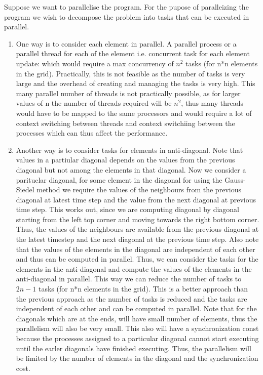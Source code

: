 \documentclass[12pt]{article}
\begin{document}
Suppose we want to parallelise the program. For the pupose of paralleizing the program we wish to decompose the problem into tasks that can be executed in parallel.
\begin{enumerate}
\item One way is to consider each element in parallel. A parallel process or a parallel thread for each of the element i.e. concurrent task for each element update:
which would require a max concurrency of $n^2$ tasks (for n*n elements in the grid). Practically, this is not feasible as the number of tasks is very large and the overhead of creating and managing the tasks is very high. This many parallel number of threads is not practically possible,
as for larger values of n the number of threads required will be $n^2$, thus many threads would have to be mapped to the same processors and would require a lot of context switching between threads and context switchiing between the processes which can thus affect the performance.
\item Another way is to consider tasks for elements in anti-diagonal. Note that values in a partiular diagonal depends on the values from the previous diagonal but not among the elements in that diagonal.
Now we consider a parituclar diagonal, for some element in the diagonal for using the Gauss-Siedel method we require the values of the neighbours from the previous diagonal at latest time step and the value from the next diagonal at previous time step. This works out, since we are computing diagonal by diagonal 
starting from the left top corner and moving towards the right bottom corner. Thus, the values of the neighbours are available from the previous diagonal at the latest timestep and the next diagonal at the previous time step. Also note that the values of the elements in the diagonal are independent of each other and thus can be computed in parallel.
Thus, we can consider the tasks for the elements in the anti-diagonal and compute the values of the elements in the anti-diagonal in parallel. This way we can reduce the number of tasks to $2n-1$ tasks (for n*n elements in the grid). This is a better approach than the previous approach as the number of tasks is reduced and the tasks are independent of each other and can be computed in parallel.
Note that for the diagonals which are at the ends, will have small number of elements, thus the parallelism will also be very small. This also will have a synchronization const because the processes assigned to a particular diagonal cannot start executing until the earler diagonals
have finished executing. Thus, the parallelism will be limited by the number of elements in the diagonal and the synchronization cost.

\end{enumerate}
\end{document}
